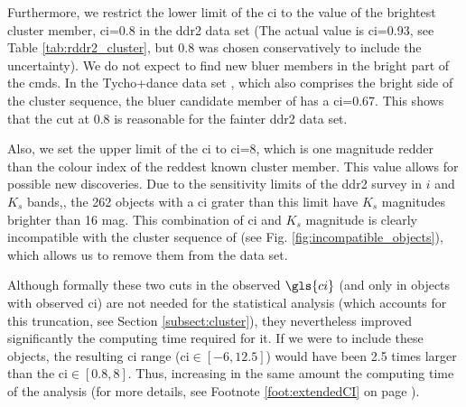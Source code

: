 Furthermore, we restrict the lower limit of the \gls{ci} to the value of the brightest cluster member, \gls{ci}=0.8 in the \gls{ddr2} data set (The actual value is \gls{ci}=0.93, see Table \ref{tab:rddr2_cluster}, but 0.8 was chosen conservatively to include the uncertainty). We do not expect to find new bluer members in the bright part of the \glspl{cmd}. In the Tycho+\gls{dance} data set \citep{Bouy2015}, which also comprises the bright side of the cluster sequence, the bluer candidate member of \citet{Bouy2015} has a \gls{ci}=0.67. This shows that the cut at 0.8 is reasonable for the fainter \gls{ddr2} data set. 

Also, we set the upper limit of the \gls{ci} to \gls{ci}=8, which is one magnitude redder than the colour index of the reddest known cluster member. This value allows for possible new discoveries. Due to the sensitivity limits of the \gls{ddr2} survey in $i$ and $K_s$ bands,\cite[$i\sim23$ mag and $K_s\sim18$ mag, see Appendix A of][]{Bouy2015}, the 262 objects with a \gls{ci} grater than this limit have $K_s$ magnitudes brighter than 16 mag. This combination of \gls{ci} and $K_s$ magnitude is clearly incompatible with the cluster sequence of \citet{Bouy2015} (see Fig. \ref{fig:incompatible_objects}), which allows us to remove  them from the data set.

Although formally these two cuts in the observed $\gls{ci}$ (and only in objects with observed \gls{ci}) are not needed for the statistical analysis (which accounts for this truncation, see Section \ref{subsect:cluster}), they nevertheless improved significantly the computing time required for it. If we were to include these objects, the resulting \gls{ci} range (\gls{ci}$\in[-6,12.5]$) would have been 2.5 times larger than the \gls{ci}$\in[0.8,8]$. Thus, increasing in the same amount the computing time of the analysis (for more details, see Footnote \ref{foot:extendedCI} on page \pageref{foot:extendedCI}).

